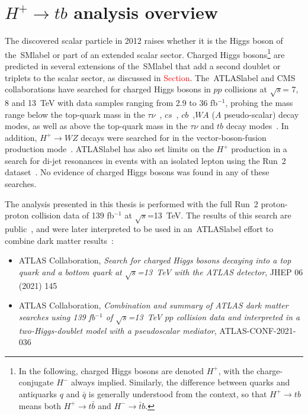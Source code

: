 \chapter{$H^+\to tb$ analysis overview}

The discovered scalar particle in 2012 raises whether it is the Higgs boson of the~\acrshort{SMlabel} or part of an extended scalar sector. Charged Higgs bosons\footnote{In the following, charged Higgs bosons are denoted $H^+$, with the charge-conjugate $H^-$ always implied. Similarly, the difference between quarks and antiquarks $q$ and $\bar{q}$ is generally understood from the context, so that $H^+\to tb$ means both $H^+\to t\bar{b}$ and $H^-\to \bar{t}b$.} are predicted in several extensions of the~\acrshort{SMlabel} that add a second doublet or triplets to the scalar sector, as discussed in \textcolor{red}{Section}. 
The~\acrshort{ATLASlabel} and CMS collaborations have searched for charged Higgs bosons in $pp$ collisions at $\sqrt{s}$= 7, 8 and 13~TeV with data samples ranging from 2.9 to 36 fb$^{-1}$, probing the mass range below the top-quark mass in the $\tau\nu$~\cite{Hplustaunu12,Hplustaunu13,Hplustaunu15,Hplustaunu12CMS,Hplustaunu15CMS,Hplustaunu18}, $cs$~\cite{Hpluscs2013,Hpluscs2015}, $cb$~\cite{HpluscbCMS,Hpluscb2022},$WA$ ($A$ pseudo-scalar) decay modes, as well as above the top-quark mass in the $\tau\nu$ and $tb$ decay modes~\cite{Hplustaunu12,Hplustaunu13,Hplustaunu15,Hplustaunu12CMS,Hplustaunu18,Hplustb2015,Sirunyan_2020,Hplustb21CMS,ATLASHptb2018}. In addition, $H^+\to WZ$ decays were searched for in the vector-boson-fusion production mode~\cite{HplusWZ15,HplusWZ15CMS}. \acrshort{ATLASlabel} has also set limits on the $H^+$ production in a search for di-jet resonances in events with an isolated lepton using the Run~2 dataset~\cite{Hplusdijet20}. No evidence of charged Higgs bosons was found in any of these searches.
    
The analysis presented in this thesis is performed with the full Run~2 proton-proton collision data of 139 fb$^{-1}$ at $\sqrt{s}$=13~TeV. The results of this search are public~\cite{Hpluspaper}, and were later interpreted to be used in an~\acrshort{ATLASlabel} effort to combine dark matter results~\cite{Hpluscomb}:

\begin{itemize}
    \item ATLAS Collaboration, \textit{Search for charged Higgs bosons decaying into a top quark and a bottom quark at $\sqrt{s}$=13~TeV with the ATLAS detector}, JHEP 06 (2021) 145
    
    \item ATLAS Collaboration, \textit{Combination and summary of ATLAS dark matter searches using 139 fb$^{-1}$ of $\sqrt{s}$=13~TeV $pp$ collision data and interpreted in a two-Higgs-doublet model with a pseudoscalar mediator}, ATLAS-CONF-2021-036
\end{itemize}

